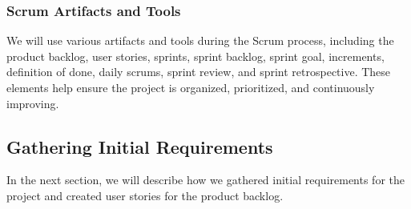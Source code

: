 \subsubsection*{Scrum Artifacts and Tools}
We will use various artifacts and tools during the Scrum process, including the product backlog, user stories, sprints, sprint backlog, sprint goal, increments, definition of done, daily scrums, sprint review, and sprint retrospective.
These elements help ensure the project is organized, prioritized, and continuously improving.

\subsection*{Gathering Initial Requirements}
In the next section, we will describe how we gathered initial requirements for the project and created user stories for the product backlog.

